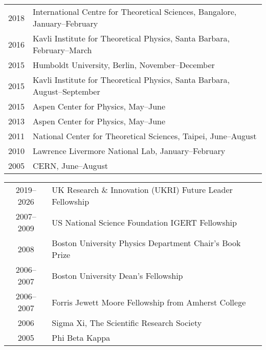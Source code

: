 \documentclass[10 pt]{article}
\renewcommand{\section}[2]%
    {\pagebreak[2]\vspace{1.3\baselineskip}%
     \hspace{0in}%
     \marginpar{
     \raggedright \scshape #1}#2}
\newcommand{\blankline}{\quad\pagebreak[2]}
\newcommand{\spacer}{\blankline\vspace{12 pt}\blankline}
\begin{document}
\vspace{-12 pt} %
\begin{tabular}[t]{cl}
  2018  & International Centre for Theoretical Sciences, Bangalore, January--February \\
  2016  & Kavli Institute for Theoretical Physics, Santa Barbara, February--March     \\
  2015  & Humboldt University, Berlin, November--December                             \\
  2015  & Kavli Institute for Theoretical Physics, Santa Barbara, August--September   \\
  2015  & Aspen Center for Physics, May--June                                         \\
  2013  & Aspen Center for Physics, May--June                                         \\
  2011  & National Center for Theoretical Sciences, Taipei, June--August              \\
  2010  & Lawrence Livermore National Lab, January--February                          \\
  2005  & CERN, June--August                                                          \\
\end{tabular}

\spacer



\section{Honors and awards} %

\vspace{-12 pt} %
\begin{tabular}[t]{cl}
  2019--2026  & UK Research \& Innovation (UKRI) Future Leader Fellowship \\
  2007--2009  & US National Science Foundation IGERT Fellowship           \\
     2008     & Boston University Physics Department Chair's Book Prize   \\
  2006--2007  & Boston University Dean's Fellowship                       \\
  2006--2007  & Forris Jewett Moore Fellowship from Amherst College       \\
     2006     & Sigma Xi, The Scientific Research Society                 \\
     2005     & Phi Beta Kappa                                            \\
\end{tabular}
\end{document}
